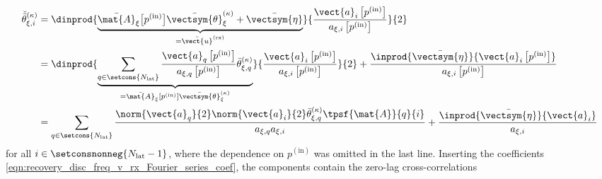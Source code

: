 \begin{equation}
\begin{split}
  \check{\bar{\theta}}_{\xi, i}^{(\kappa)}
  &=
  \dinprod{
    \underbrace{
      \bar{\mat{A}}_{\xi}\bigl[ p^{(\text{in})} \bigr]
      \bar{\vectsym{\theta}}_{\xi}^{(\kappa)}
      +
      \bar{\vectsym{\eta}}
    }_{ = \bar{\vect{u}}^{(\text{rx})} }
  }{
    \frac{
      \vect{a}_{i}\left[ p^{(\text{in})} \right]
    }{
      a_{ \xi, i }\left[ p^{(\text{in})} \right]
    }
  }{2}\\
  &=
  \dinprod{
    \underbrace{
      \sum_{ q \in \setcons{ N_{\text{lat}} } }
        \frac{
          \vect{a}_{q}\left[ p^{(\text{in})} \right]
        }{
          a_{ \xi, q }\left[ p^{(\text{in})} \right]
        }
        \bar{\theta}_{\xi, q}^{(\kappa)}
    }_{ = \bar{\mat{A}}_{\xi}[ p^{(\text{in})} ] \bar{\vectsym{\theta}}_{\xi}^{(\kappa)} }    
  }{
    \frac{
      \vect{a}_{i}\left[ p^{(\text{in})} \right]
    }{
      a_{ \xi, i }\left[ p^{(\text{in})} \right]
    }
  }{2}
  +
  \frac{
    \inprod{ \bar{\vectsym{\eta}} }{ \vect{a}_{i}\left[ p^{(\text{in})} \right] }
  }{
    a_{ \xi, i }\left[ p^{(\text{in})} \right]
  }\\
  &=
  \sum_{ q \in \setcons{ N_{\text{lat}} } }
    \frac{
      \norm{ \vect{a}_{q} }{2}
      \norm{ \vect{a}_{i} }{2}
      \bar{\theta}_{\xi, q}^{(\kappa)}
      \tpsf{ \mat{A} }{ q }{ i }
    }{
      a_{ \xi, q } a_{ \xi, i }
    }
  +
  \frac{
    \inprod{ \bar{\vectsym{\eta}} }{ \vect{a}_{i} }
  }{
    a_{ \xi, i }
  }
\end{split}
\label{eqn:app_adjoint_tpsf}
\end{equation}
for
all $i \in \setconsnonneg{ N_{\text{lat}} - 1 }$, where
the dependence on
$p^{(\text{in})}$ was omitted in
the last line.
Inserting
the  coefficients
\eqref{eqn:recovery_disc_freq_v_rx_Fourier_series_coef},
the components contain
the zero-lag cross-correlations
